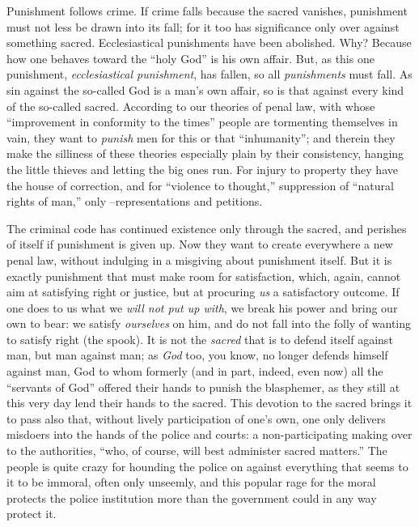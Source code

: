 Punishment follows crime. If crime falls because the sacred vanishes, 
punishment must not less be drawn into its fall; for it too has significance 
only over against something sacred. Ecclesiastical punishments have been 
abolished. Why? Because how one behaves toward the ``holy God'' is his own 
affair. But, as this one punishment, \textit{ecclesiastical punishment}, has 
fallen, so all \textit{punishments} must fall. As sin against the so-called 
God is a man's own affair, so is that against every kind of the so-called 
sacred. According to our theories of penal law, with whose ``improvement in 
conformity to the times'' people are tormenting themselves in vain, they want 
to \textit{punish} men for this or that ``inhumanity''; and therein they 
make the silliness of these theories especially plain by their consistency, 
hanging the little thieves and letting the big ones run. For injury to 
property they have the house of correction, and for ``violence to thought,'' 
suppression of ``natural rights of man,'' only --representations and 
petitions.

The criminal code has continued existence only through the sacred, and 
perishes of itself if punishment is given up. Now they want to create 
everywhere a new penal law, without indulging in a misgiving about punishment 
itself. But it is exactly punishment that must make room for satisfaction, 
which, again, cannot aim at satisfying right or justice, but at procuring 
\textit{us} a satisfactory outcome. If one does to us what we \textit{will not 
put up with}, we break his power and bring our own to bear: we satisfy 
\textit{ourselves} on him, and do not fall into the folly of wanting to 
satisfy right (the spook). It is not the \textit{sacred} that is to defend 
itself against man, but man against man; as \textit{God} too, you know, no 
longer defends himself against man, God to whom formerly (and in part, indeed, 
even now) all the ``servants of God'' offered their hands to punish the 
blasphemer, as they still at this very day lend their hands to the sacred. 
This devotion to the sacred brings it to pass also that, without lively 
participation of one's own, one only delivers misdoers into the hands of the 
police and courts: a non-participating making over to the authorities, ``who, 
of course, will best administer sacred matters.'' The people is quite crazy 
for hounding the police on against everything that seems to it to be immoral, 
often only unseemly, and this popular rage for the moral protects the police 
institution more than the government could in any way protect it.

